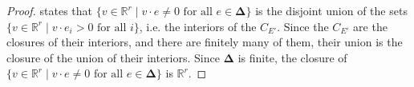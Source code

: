 \documentclass[11pt,letterpaper]{article}
\theoremstyle{definition}
\theoremstyle{remark}
\numberwithin{equation}{section}
\theoremstyle{dotless}
\newcommand{\hchi}{\psi} %
\begin{document}
\begin{proof} \cite[Proposition 2]{HeckenbergerRank2} states that  $\{ v \in \mathbb R^r \mid v \cdot e \neq 0 \textrm{ for all }e\in \mathbf \Delta\}$ is the disjoint union of the sets $\{ v\in \mathbb R^r \mid v\cdot e_i>0 \textrm{ for all }i \}$, i.e. the interiors of the $C_{E'}$. Since the $C_{E'}$ are the closures of their interiors, and there are finitely many of them, their union is the closure of the union of their interiors. Since $\mathbf \Delta$ is finite, the closure of $\{ v \in \mathbb R^r \mid v \cdot e \neq 0 \textrm{ for all }e\in \mathbf \Delta\}$ is $\mathbb R^r$.\end{proof}




\end{document}
